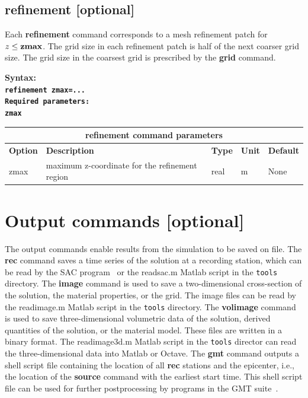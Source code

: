 \documentclass[11pt]{report}
\begin{document}
{%
\subsection{refinement [optional]}
\label{keyword:refinement}
Each {\bf refinement} command corresponds to a mesh refinement patch for $z\leq{\bf zmax}$. The grid
size in each refinement patch is half of the next coarser grid size. The grid size in the coarsest
grid is prescribed by the {\bf grid} command.
\begin{flushleft}\bf
	Syntax:\\
	\tt refinement zmax=...
	\\
	\bf Required parameters:\\
	\tt zmax
\end{flushleft}
%
\begin{center}
	\begin{tabular}{|l|p{8cm}|l|l|l|} \hline
		\multicolumn{5}{|c|}{\bf refinement command parameters}                                             \\ \hline
		\bf{Option} & \bf{Description}                               & \bf{Type} & \bf{Unit} & \bf{Default} \\ \hline \hline
		zmax        & maximum z-coordinate for the refinement region & real      & m         & None         \\ \hline
	\end{tabular}
\end{center}

\section{Output commands [optional]}

The output commands enable results from the simulation to be saved on file. The {\bf rec} command
saves a time series of the solution at a recording station, which can be read by the SAC
program~\cite{Goldstein-et-al} or the readsac.m Matlab script in the {\tt tools} directory. The {\bf
		image} command is used to save a two-dimensional cross-section of the solution, the material
properties, or the grid. The image files can be read by the readimage.m Matlab script in the
	{\tt tools} directory. The {\bf volimage} command is used to save three-dimensional volumetric data
of the solution, derived quantities of the solution, or the material model. These files are written
in a binary format. The readimage3d.m Matlab script in the {\tt tools} director can read the
three-dimensional data into Matlab or Octave.
The {\bf gmt} command outputs a shell script file containing the location of all {\bf rec}
stations and the epicenter, i.e., the location of the {\bf source} command with the earliest start
time. This shell script file can be used for further postprocessing by programs in the GMT
suite~\cite{WesselSmithGMT}.
}
\end{document}
